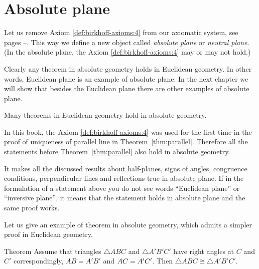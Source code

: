 \chapter{Absolute plane}\label{chap:non-euclid}

Let us remove Axiom \ref{def:birkhoff-axioms:4} from our axiomatic system, see pages \pageref{def:birkhoff-axioms:0}--\pageref{def:birkhoff-axioms:4}.
This way we define a new object called 
\emph{absolute plane} or \emph{neutral plane}.
(In the absolute plane, 
the Axiom \ref{def:birkhoff-axioms:4} may or may not hold.)

Clearly any theorem in absolute geometry holds in Euclidean geometry.
In other words, Euclidean plane is an example of absolute plane. 
In the next chapter we will show that besides the Euclidean plane
there are other examples of absolute plane.

Many theorems in Euclidean geometry  hold in absolute geometry.

In this book, 
the Axiom \ref{def:birkhoff-axioms:4} was used
for the first time in the proof of uniqueness of parallel line in Theorem~\ref{thm:parallel}.
Therefore all the statements before Theorem~\ref{thm:parallel} also hold in absolute geometry.

It makes all the discussed results
about
half-planes,
signs of angles,
congruence conditions,
perpendicular lines and reflections 
true in absolute plane.
If in the formulation of a statement above you do not see words ``Euclidean plane'' or ``inversive plane'',
it means that the statement holds in absolute plane and the same proof works.

Let us give an example of theorem in absolute geometry,
which admits a simpler proof in Euclidean geometry. 

\begin{thm}{Theorem}
Assume that triangles $\triangle ABC$ and $\triangle A'B'C'$
have right angles at $C$ and $C'$ correspondingly, 
$AB=A'B'$ and $AC\z=A'C'$.
Then $\triangle ABC\cong\triangle A'B'C'$.
\end{thm}


